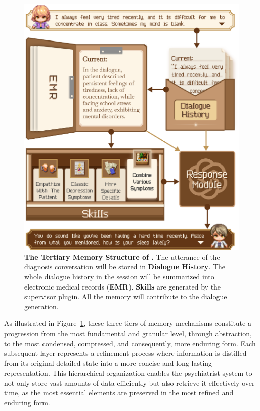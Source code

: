 \begin{figure}[!t]
    \centering
    \includegraphics[width=1\linewidth]{fig/memory.png}
    \caption{\textbf{The Tertiary Memory Structure of \system.} The utterance of the diagnosis conversation will be stored in \textbf{Dialogue History}. The whole dialogue history in the session will be summarized into electronic medical records (\textbf{EMR}). \textbf{Skills} are generated by the supervisor plugin. All the memory will contribute to the dialogue generation.}
    \label{fig:memory structure}
\end{figure}

As illustrated in Figure~\ref{fig:memory structure}, these three tiers of memory mechanisms constitute a progression from the most fundamental and granular level, through abstraction, to the most condensed, compressed, and consequently, more enduring form. Each subsequent layer represents a refinement process where information is distilled from its original detailed state into a more concise and long-lasting representation. This hierarchical organization enables the psychiatrist system to not only store vast amounts of data efficiently but also retrieve it effectively over time, as the most essential elements are preserved in the most refined and enduring form.

